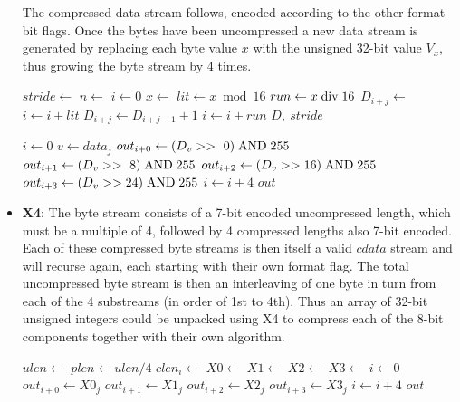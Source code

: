 \documentclass[a4paper]{article}
\begin{document}
\begin{itemize}
The compressed data stream follows, encoded according to the other
format bit flags. Once the bytes have been uncompressed a new data
stream is generated by replacing each byte value $x$ with the unsigned
32-bit value $V_x$, thus growing the byte stream by 4 times.
  
\begin{algorithmic}[1]
  \State $stride \gets $
  \State $n \gets $
  \State $i \gets 0$
    \State $x \gets $
    \State $lit \gets x \bmod 16$
    \State $run \gets x \bdiv 16$
      \State $D_{i+j} \gets $
    \EndFor
    \State $i \gets i + lit$
        \State $D_{i+j} \gets D_{i+j-1}+1$
      \EndFor
      \State $i \gets i + run$
    \EndIf
  \EndWhile
  \State \Return $D,\ stride$
\EndFunction
\end{algorithmic}

\begin{algorithmic}[1]
  \State $i \gets 0$
  \State $v \gets data_j$
  \State $out_{i+0} \gets (D_v >> \ 0) \bitand 255$
  \State $out_{i+1} \gets (D_v >> \ 8) \bitand 255$
  \State $out_{i+2} \gets (D_v >> 16) \bitand 255$ 
  \State $out_{i+3} \gets (D_v >> 24) \bitand 255$
  \State $i \gets i + 4$ 
 \EndFor
  \State \Return $out$
\EndFunction
\end{algorithmic}

\item{\textbf{X4}:}
The byte stream consists of a 7-bit encoded uncompressed length, which
must be a multiple of 4, followed by 4 compressed lengths also 7-bit
encoded.  Each of these compressed byte streams is then itself a valid
$cdata$ stream and will recurse again, each starting with their own
format flag.  The total uncompressed byte stream is then an
interleaving of one byte in turn from each of the 4 substreams (in
order of 1st to 4th).  Thus an array of 32-bit unsigned integers could
be unpacked using X4 to compress each of the 8-bit components together
with their own algorithm.

\begin{algorithmic}[1]
  \State $ulen \gets $
  \State $plen \gets ulen / 4$
   
    \State $clen_i \gets $
  \EndFor
  \State $X0 \gets $ 
  \State $X1 \gets $
  \State $X2 \gets $
  \State $X3 \gets $
  \Statex
  \State $i \gets 0$
   
    \State $out_{i+0} \gets X0_j$
    \State $out_{i+1} \gets X1_j$
    \State $out_{i+2} \gets X2_j$
    \State $out_{i+3} \gets X3_j$
    \State $i \gets i+4$
  \EndFor
  \State \Return $out$
\EndFunction
\end{algorithmic}


\end{itemize}
\end{document}
